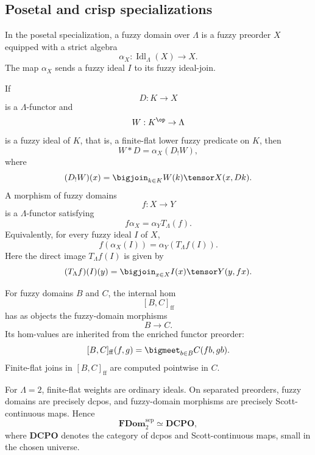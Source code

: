 \subsection{Posetal and crisp specializations}
\label{subsec:posetal-crisp-fdom-category}

In the posetal specialization, a fuzzy domain over \(\Lambda\) is a fuzzy
preorder \(X\) equipped with a strict algebra
\[
    \alpha_X:\operatorname{Idl}_{\Lambda}(X)\to X.
\]
The map \(\alpha_X\) sends a fuzzy ideal \(I\) to its fuzzy ideal-join.

If
\[
    D:K\to X
\]
is a \(\Lambda\)-functor and
\[
    W:K^{\op}\to\Lambda
\]
is a fuzzy ideal of \(K\), that is, a finite-flat lower fuzzy predicate on
\(K\), then
\[
    W*D=\alpha_X(D_!W),
\]
where
\[
    (D_!W)(x)
    =
    \bigjoin_{k\in K}W(k)\tensor X(x,Dk).
\]
A morphism of fuzzy domains
\[
    f:X\to Y
\]
is a \(\Lambda\)-functor satisfying
\[
    f\alpha_X=\alpha_YT_{\Lambda}(f).
\]
Equivalently, for every fuzzy ideal \(I\) of \(X\),
\[
    f(\alpha_X(I))
    =
    \alpha_Y(T_{\Lambda}f(I)).
\]
Here the direct image \(T_{\Lambda}f(I)\) is given by
\[
    (T_{\Lambda}f)(I)(y)
    =
    \bigjoin_{x\in X}I(x)\tensor Y(y,fx).
\]

For fuzzy domains \(B\) and \(C\), the internal hom
\[
    [B,C]_{\mathrm{ff}}
\]
has as objects the fuzzy-domain morphisms
\[
    B\to C.
\]
Its hom-values are inherited from the enriched functor preorder:
\[
    [B,C]_{\mathrm{ff}}(f,g)
    =
    \bigmeet_{b\in B}C(fb,gb).
\]
Finite-flat joins in \([B,C]_{\mathrm{ff}}\) are computed pointwise in \(C\).

For \(\Lambda=2\), finite-flat weights are ordinary ideals.  On separated
preorders, fuzzy domains are precisely dcpos, and fuzzy-domain morphisms are
precisely Scott-continuous maps.  Hence
\[
    \mathbf{FDom}_{2}^{\mathrm{sep}}
    \simeq
    \mathbf{DCPO},
\]
where \(\mathbf{DCPO}\) denotes the category of dcpos and Scott-continuous maps,
small in the chosen universe.

